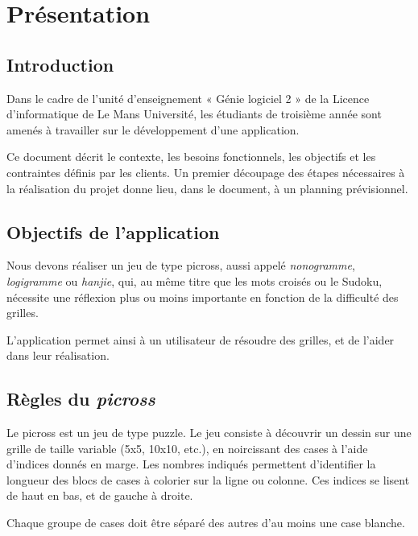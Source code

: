 \documentclass[a4paper, 12pt]{report}
\begin{document}
\renewcommand{\contentsname}{Sommaire}
\tableofcontents

\newpage
\chapter{Présentation}
\vspace*{0.5cm}
	\section{Introduction}

		Dans le cadre de l'unité d'enseignement « Génie logiciel 2 » de la Licence d'informatique de Le Mans Université, les étudiants de troisième année sont amenés à travailler sur le développement d'une application.
		
		Ce document décrit le contexte, les besoins fonctionnels, les objectifs et les contraintes définis par les clients. Un premier découpage des étapes nécessaires à la réalisation du projet donne lieu, dans le document, à un planning prévisionnel.

	
 	\section{Objectifs de l'application}	
 	
		Nous devons réaliser un jeu de type picross, aussi appelé \textit{nonogramme}, \textit{logigramme} ou \textit{hanjie}, qui, au même titre que les mots croisés ou le Sudoku, nécessite une réflexion plus ou moins importante en fonction de la difficulté des grilles.
		
		L'application permet ainsi à un utilisateur de résoudre des grilles, et de l'aider dans leur réalisation.

	\section{Règles du \textit{picross}}
	
		Le picross est un jeu de type puzzle. Le jeu consiste à découvrir un dessin sur une grille de taille variable (5x5, 10x10, etc.), en noircissant des cases à l'aide d'indices donnés en marge.
		Les nombres indiqués permettent d'identifier la longueur des blocs de cases à colorier sur la ligne ou colonne. Ces indices se lisent de haut en bas, et de gauche à droite.
		
		Chaque groupe de cases doit être séparé des autres d'au moins une case blanche.
		
\end{document}
